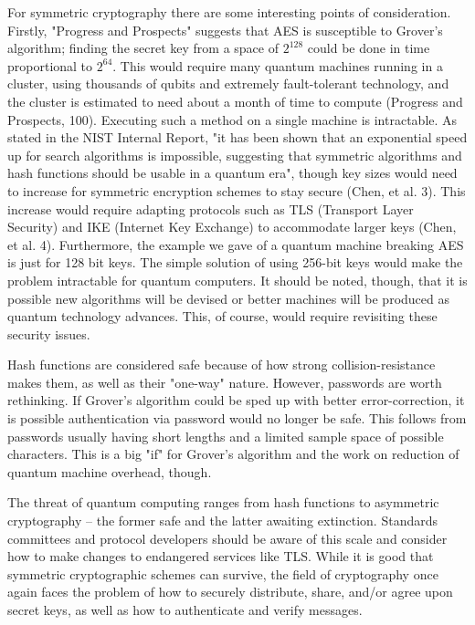 \documentclass[11pt]{article}
\begin{document}
For symmetric cryptography there are some interesting points of consideration.
Firstly, "Progress and Prospects" suggests that AES is susceptible to Grover's algorithm; finding
the secret key from a space of $2^{128}$ could be done in time proportional to $2^{64}$.
This would require many quantum machines running in a cluster, using thousands of
qubits and extremely fault-tolerant technology, and the cluster is
estimated to need about a month of time to compute
(Progress and Prospects, 100).
Executing such a method on a single machine is intractable.
As stated in the NIST Internal Report, "it has been shown that an exponential speed up for search algorithms is impossible, suggesting that symmetric algorithms and hash functions should
be usable in a quantum era", though key sizes would need to increase for symmetric encryption schemes to stay secure (Chen, et al. 3).
This increase would require adapting protocols such as TLS (Transport Layer Security) and IKE (Internet Key Exchange) to accommodate larger keys (Chen, et al. 4). 
Furthermore, the example we gave of a quantum machine breaking AES is just for 128 bit keys.
The simple solution of using 256-bit keys would make the problem intractable for quantum
computers.
It should be noted, though, that it is possible new algorithms will be devised or better
machines will be produced as quantum technology advances.
This, of course, would require revisiting these security issues.


Hash functions are considered safe because of how strong collision-resistance makes them,
as well as their "one-way" nature.
However, passwords are worth rethinking. If Grover's algorithm could be
sped up with better error-correction, it is possible authentication via password
would no longer be safe. This follows from passwords usually having short lengths and
a limited sample space of possible characters. This is a big "if" for Grover's algorithm and the work on reduction of quantum machine overhead, though.

The threat of quantum computing ranges from hash functions to asymmetric cryptography -- the former safe and the latter awaiting extinction.
Standards committees and protocol developers should be aware of this scale and consider
how to make changes to endangered services like TLS.
While it is good that symmetric cryptographic schemes can survive, the field of
cryptography once again faces the problem of how to securely distribute, share,
and/or agree upon secret keys, as well as how to authenticate and verify messages. 
\end{document}
